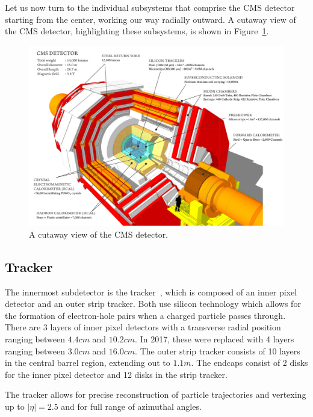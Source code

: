 Let us now turn to the individual subsystems that comprise the CMS detector
starting from the center, working our way radially outward. A cutaway view of
the CMS detector, highlighting these subsystems, is shown in
Figure~\ref{fig:cmsdetector}.

\begin{figure}[!htbp]
    \centering
    \includegraphics[width=0.99\linewidth]{figs/misc/cms.png}
    \caption{
        A cutaway view of the CMS detector.
    }
    \label{fig:cmsdetector}
\end{figure}

\FloatBarrier

\subsection{Tracker}

The innermost subdetector is the
tracker~\cite{CMS:TRK11001,CMS:Dominguez1481838}, which is composed of an
inner pixel detector and an outer strip tracker. Both use silicon technology
which allows for the formation of electron-hole pairs when a charged particle
passes through.
There are 3 layers of inner
pixel detectors with a transverse radial position ranging between $4.4\unit{cm}$ and $10.2\unit{cm}$. In 2017,
these were replaced with 4 layers ranging between $3.0\unit{cm}$ and $16.0\unit{cm}$.
The outer strip tracker consists of 10 layers in the central barrel region, extending
out to $1.1\unit{m}$. The endcaps consist of 2 disks for the inner pixel detector
and 12 disks in the strip tracker.

The tracker allows for precise reconstruction of particle trajectories and 
vertexing up to $|\eta|=2.5$ and for full range of azimuthal angles.

